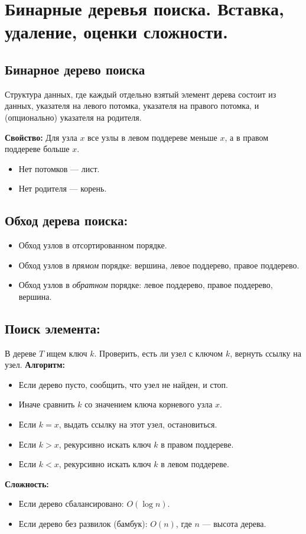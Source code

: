 \section{Бинарные деревья поиска. Вставка, удаление, оценки сложности.}

\subsection*{Бинарное дерево поиска}
Структура данных, где каждый отдельно взятый элемент дерева состоит из данных, указателя на левого потомка, указателя на правого потомка, и (опционально) указателя на родителя.

\textbf{Свойство:} Для узла $x$ все узлы в левом поддереве меньше $x$, а в правом поддереве больше $x$.
\begin{itemize}
	\item Нет потомков --- лист.
	\item Нет родителя --- корень.
\end{itemize}

\subsection*{Обход дерева поиска:}
\begin{itemize}
	\item Обход узлов в отсортированном порядке.
	\item Обход узлов в \textit{прямом} порядке: вершина, левое поддерево, правое поддерево.
	\item Обход узлов в \textit{обратном} порядке: левое поддерево, правое поддерево, вершина.
\end{itemize}

\subsection*{Поиск элемента:}
В дереве $T$ ищем ключ $k$. Проверить, есть ли узел с ключом $k$, вернуть ссылку на узел.
\textbf{Алгоритм:}
\begin{itemize}
	\item Если дерево пусто, сообщить, что узел не найден, и стоп.
	\item Иначе сравнить $k$ со значением ключа корневого узла $x$.
	\item Если $k=x$, выдать ссылку на этот узел, остановиться.
	\item Если $k>x$, рекурсивно искать ключ $k$ в правом поддереве.
	\item Если $k<x$, рекурсивно искать ключ $k$ в левом поддереве.
\end{itemize}
\textbf{Сложность:}
\begin{itemize}
	\item Если дерево сбалансировано: $O(\log n)$.
	\item Если дерево без развилок (бамбук): $O(n)$, где $n$ --- высота дерева.
\end{itemize}

